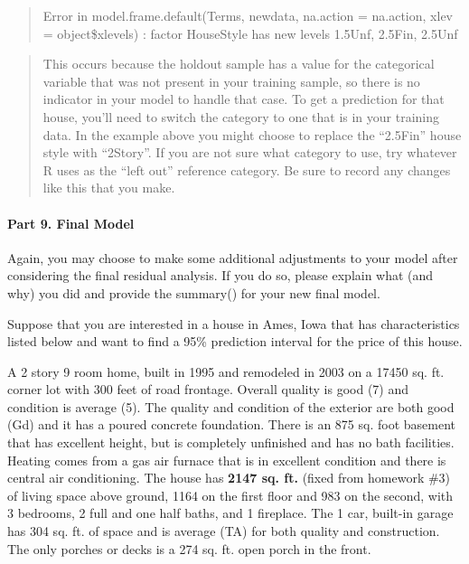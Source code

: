 \documentclass[
]{article}
\begin{document}
\begin{quote}
Error in model.frame.default(Terms, newdata, na.action = na.action, xlev
= object\$xlevels) : factor HouseStyle has new levels 1.5Unf, 2.5Fin,
2.5Unf
\end{quote}

\begin{quote}
This occurs because the holdout sample has a value for the categorical
variable that was not present in your training sample, so there is no
indicator in your model to handle that case. To get a prediction for
that house, you'll need to switch the category to one that is in your
training data. In the example above you might choose to replace the
``2.5Fin'' house style with ``2Story''. If you are not sure what
category to use, try whatever R uses as the ``left out'' reference
category. Be sure to record any changes like this that you make.
\end{quote}

\hypertarget{part-9.-final-model}{%
\paragraph{Part 9. Final Model}\label{part-9.-final-model}}

Again, you may choose to make some additional adjustments to your model
after considering the final residual analysis. If you do so, please
explain what (and why) you did and provide the summary() for your new
final model.

Suppose that you are interested in a house in Ames, Iowa that has
characteristics listed below and want to find a 95\% prediction interval
for the price of this house.

A 2 story 9 room home, built in 1995 and remodeled in 2003 on a 17450
sq. ft. corner lot with 300 feet of road frontage. Overall quality is
good (7) and condition is average (5). The quality and condition of the
exterior are both good (Gd) and it has a poured concrete foundation.
There is an 875 sq. foot basement that has excellent height, but is
completely unfinished and has no bath facilities. Heating comes from a
gas air furnace that is in excellent condition and there is central air
conditioning. The house has \textbf{2147 sq. ft.} (fixed from homework
\#3) of living space above ground, 1164 on the first floor and 983 on
the second, with 3 bedrooms, 2 full and one half baths, and 1 fireplace.
The 1 car, built-in garage has 304 sq. ft. of space and is average (TA)
for both quality and construction. The only porches or decks is a 274
sq. ft. open porch in the front.
\end{document}
